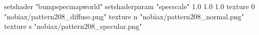 setshader "bumpspecmapworld"
setshaderparam "specscale" 1.0 1.0 1.0
    texture 0 "nobiax/pattern208_diffuse.png"
    texture n "nobiax/pattern208_normal.png"
    texture s "nobiax/pattern208_specular.png"